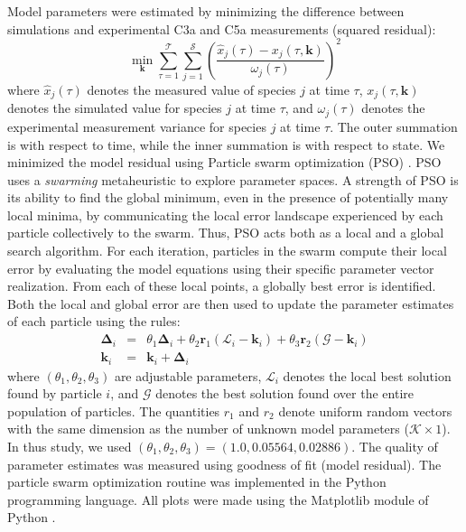 \documentclass[12pt]{article}
\begin{document}
Model parameters were estimated by minimizing the difference between simulations and \linebreak experimental C3a and C5a measurements (squared residual):
\begin{equation}\label{eqn:objective-function}
	\min_{\mathbf{k}} \sum_{\tau=1}^{\mathcal{T}}\sum_{j=1}^{\mathcal{S}}\left(\frac{\hat{x}_{j}\left(\tau\right) - x_{j}\left(\tau,\mathbf{k}\right)}{\omega_{j}\left(\tau\right)}\right)^{2}
\end{equation}where $\hat{x}_{j}\left(\tau\right)$ denotes the measured value of species $j$ at time $\tau$, $x_{j}\left(\tau,\mathbf{k}\right)$ denotes the simulated 
value for species $j$ at time $\tau$, and $\omega_{j}\left(\tau\right)$ denotes the experimental measurement variance for species $j$ at time $\tau$. The outer summation is with respect to
time, while the inner summation is with respect to state. We minimized the model residual using Particle swarm optimization (PSO) \citep{PSO}.
PSO uses a \textit{swarming} metaheuristic to explore parameter spaces. 
A strength of PSO is its ability to find the global minimum, even in the presence of potentially many local minima, by communicating the local
error landscape experienced by each particle collectively to the swarm. Thus, PSO acts both as a local and a global search algorithm. 
For each iteration, particles in the swarm compute their local error by evaluating the model equations using their specific parameter vector realization.
From each of these local points, a globally best error is identified. Both the local and global error 
are then used to update the parameter estimates of each particle using the rules:
\begin{eqnarray}
	\mathbf{\Delta}_{i} &=&\theta_{1}\mathbf{\Delta}_{i} + \theta_{2}\mathbf{r}_{1}\left(\mathcal{L}_{i} - \mathbf{k}_{i}\right) + \theta_{3}\mathbf{r}_{2}\left(\mathcal{G} - \mathbf{k}_{i}\right) \\
	\mathbf{k}_{i} &=& \mathbf{k}_{i} + \mathbf{\Delta}_{i}
\end{eqnarray}where $\left(\theta_{1},\theta_{2},\theta_{3}\right)$ are adjustable parameters, $\mathcal{L}_{i}$ denotes the local best solution found by particle $i$, and
$\mathcal{G}$ denotes the best solution found over the entire population of particles. The quantities $r_{1}$ and $r_{2}$ denote uniform random vectors with the same dimension as the number of unknown model
parameters \linebreak($\mathcal{K}\times{1}$). In thus study, we used $\left(\theta_{1},\theta_{2},\theta_{3}\right) = \left(1.0, 0.05564, 0.02886\right)$. The quality of parameter
estimates was measured using goodness of fit (model residual). The particle swarm optimization routine was implemented in the Python programming language. 
All plots were made using the Matplotlib module of Python \citep{Matplotlib}.
\end{document}

